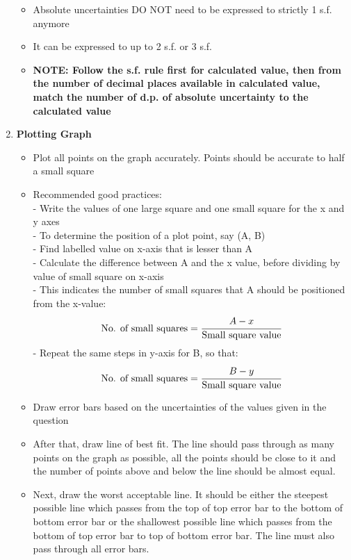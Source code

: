 \documentclass{article}
\begin{document}
\begin{enumerate}
\begin{itemize}
\begin{enumerate}
    
        \end{enumerate}
        \item Absolute uncertainties DO NOT need to be expressed to strictly 1 s.f. anymore
        \item It can be expressed to up to 2 s.f. or 3 s.f.
        \item \textbf{NOTE: Follow the s.f. rule first for calculated value, then from the number of decimal places available in calculated value, match the number of d.p. of absolute uncertainty to the calculated value}
    \end{itemize}
    \item \textbf{Plotting Graph}
    \begin{itemize}
        \item Plot all points on the graph accurately. Points should be accurate to half a small square
        \item Recommended good practices:\\
            -   Write the values of one large square and one small square for the x and y axes\\
            -	To determine the position of a plot point, say (A, B)\\
            -	Find labelled value on x-axis that is lesser than A\\
            -	Calculate the difference between A and the x value, before dividing by value of small square on x-axis\\
            -   This indicates the number of small squares that A should be positioned from the x-value:
            $$\mbox{No. of small squares}=\cfrac{A-x}{\mbox{Small square value}}$$
            -   Repeat the same steps in y-axis for B, so that:
            $$\mbox{No. of small squares}=\cfrac{B-y}{\mbox{Small square value}}$$
        \item Draw error bars based on the uncertainties of the values given in the question
        \item After that, draw line of best fit. The line should pass through as many points on the graph as possible, all the points should be close to it and the number of points above and below the line should be almost equal.
        \item Next, draw the worst acceptable line. It should be either the steepest possible line which passes from the top of top error bar to the bottom of bottom error bar or the shallowest possible line which passes from the bottom of top error bar to top of bottom error bar. The line must also pass through all error bars.

\end{itemize}
\end{enumerate}
\end{document}
